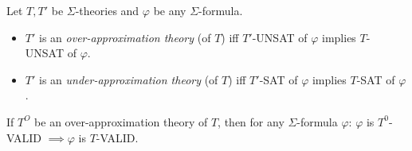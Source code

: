 \begin{comment}
\begin{definition} \label{def:app}
Let $F = \exists x_1 \in I_1 \cdots x_n \in I_n. \psi(x_1,\cdots,x_n)$. 
For a truth assignment on $M$, $F$ is 
\begin{itemize}
\item $T$-valid if $M \models_T \psi(x_1,\cdots,$ $x_n)$, 
\item $T$-satisfiable ($T$-SAT) if $m \models_T \psi(x_1,\cdots,x_n)$ 
for some $m \in M$, and 
\item $T$-unsatisfiable ($T$-UNSAT) if $M \models_T \neg \psi(x_1,\cdots,x_n)$. 
\end{itemize}
If $T$ is clear from the context, we simply say valid, satisfiable, and unsatisfiable. 
\end{definition}
\end{comment}


\begin{definition} \label{def:ApproxTheory}
Let $T, T'$ be $\Sigma$-theories and $\varphi$ be any $\Sigma$-formula. 
\begin{itemize}
\item $T'$ is an {\em over-approximation theory} (of $T$) 
iff $T'$-UNSAT of $\varphi$ implies $T$-UNSAT of $\varphi$.
\item $T'$ is an {\em under-approximation theory} (of $T$)
iff $T'$-SAT of $\varphi$ implies $T$-SAT of $\varphi$. 
\end{itemize}
\end{definition}

\begin{theorem}
If $T^O$ be an over-approximation theory of $T$, then for any $\Sigma$-formula $\varphi$: $\varphi$ is $T^0$-VALID $\implies \varphi$ is $T$-VALID.
\end{theorem}

